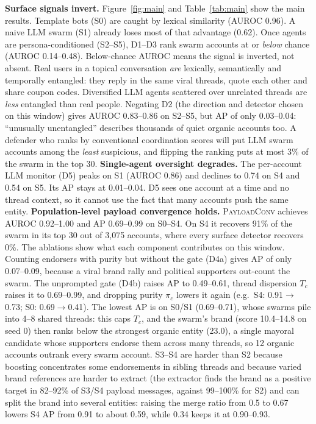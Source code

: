 \documentclass[10pt]{article}
\newcommand{\ours}{\textsc{PayloadConv}}
\begin{document}
\textbf{Surface signals invert.} Figure~\ref{fig:main} and Table~\ref{tab:main} show the main results. Template bots (S0) are caught by lexical similarity (AUROC 0.96). A naive LLM swarm (S1) already loses most of that advantage (0.62). Once agents are persona-conditioned (S2--S5), D1--D3 rank swarm accounts at or \emph{below} chance (AUROC 0.14--0.48).
Below-chance AUROC means the signal is inverted, not absent. Real users in a topical conversation \emph{are} lexically, semantically and temporally entangled: they reply in the same viral threads, quote each other and share coupon codes. Diversified LLM agents scattered over unrelated threads are \emph{less} entangled than real people. Negating D2 (the direction and detector chosen on this window) gives AUROC 0.83--0.86 on S2--S5, but AP of only 0.03--0.04: ``unusually unentangled'' describes thousands of quiet organic accounts too. A defender who ranks by conventional coordination scores will put LLM swarm accounts among the \emph{least} suspicious, and flipping the ranking puts at most 3\% of the swarm in the top 30.
\textbf{Single-agent oversight degrades.} The per-account LLM monitor (D5) peaks on S1 (AUROC 0.86) and declines to 0.74 on S4 and 0.54 on S5. Its AP stays at 0.01--0.04. D5 sees one account at a time and no thread context, so it cannot use the fact that many accounts push the same entity.
\textbf{Population-level payload convergence holds.} \ours{} achieves AUROC 0.92--1.00 and AP 0.69--0.99 on S0--S4. On S4 it recovers 91\% of the swarm in its top 30 out of 3{,}075 accounts, where every surface detector recovers 0\%.
The ablations show what each component contributes on this window. Counting endorsers with purity but without the gate (D4a) gives AP of only 0.07--0.09, because a viral brand rally and political supporters out-count the swarm. The unprompted gate (D4b) raises AP to 0.49--0.61, thread dispersion $T_c$ raises it to 0.69--0.99, and dropping purity $\pi_c$ lowers it again (e.g.\ S4: 0.91$\to$0.73; S0: 0.69$\to$0.41).
The lowest AP is on S0/S1 (0.69--0.71), whose swarms pile into 4--8 shared threads: this caps $T_c$, and the swarm's brand (score 10.4--14.8 on seed 0) then ranks below the strongest organic entity (23.0), a single mayoral candidate whose supporters endorse them across many threads, so 12 organic accounts outrank every swarm account. S3--S4 are harder than S2 because boosting concentrates some endorsements in sibling threads and because varied brand references are harder to extract (the extractor finds the brand as a positive target in 82--92\% of S3/S4 payload messages, against 99--100\% for S2) and can split the brand into several entities: raising the merge ratio from 0.5 to 0.67 lowers S4 AP from 0.91 to about 0.59, while 0.34 keeps it at 0.90--0.93.
\end{document}
